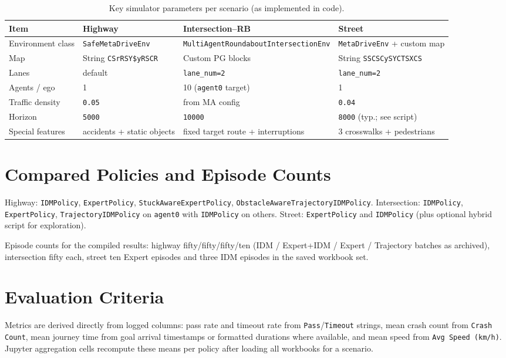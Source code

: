 \documentclass[12pt,a4paper]{report}
\begin{document}
\begin{table}[H]
    \centering
    \caption{Key simulator parameters per scenario (as implemented in code).}
    \label{tab:param_summary}
    \begin{tabularx}{\textwidth}{>{\raggedright\arraybackslash}p{3.1cm} X X X}
        \toprule
        Item & Highway & Intersection--RB & Street \\
        \midrule
        Environment class & \texttt{SafeMetaDriveEnv} & \texttt{MultiAgentRoundaboutIntersectionEnv} & \texttt{MetaDriveEnv} + custom map \\
        Map & String \texttt{CSrRSY\$yRSCR} & Custom PG blocks & String \texttt{SSCSCySYCTSXCS} \\
        Lanes & default & \texttt{lane\_num=2} & \texttt{lane\_num=2} \\
        Agents / ego & 1 & 10 (\texttt{agent0} target) & 1 \\
        Traffic density & \texttt{0.05} & from MA config & \texttt{0.04} \\
        Horizon & \texttt{5000} & \texttt{10000} & \texttt{8000} (typ.; see script) \\
        Special features & accidents + static objects & fixed target route + interruptions & 3 crosswalks + pedestrians \\
        \bottomrule
    \end{tabularx}
\end{table}

\section{Compared Policies and Episode Counts}
Highway: \texttt{IDMPolicy}, \texttt{ExpertPolicy}, \texttt{StuckAwareExpertPolicy}, \texttt{ObstacleAwareTrajectoryIDMPolicy}. Intersection: \texttt{IDMPolicy}, \texttt{ExpertPolicy}, \texttt{TrajectoryIDMPolicy} on \texttt{agent0} with \texttt{IDMPolicy} on others. Street: \texttt{ExpertPolicy} and \texttt{IDMPolicy} (plus optional hybrid script for exploration).

Episode counts for the compiled results: highway fifty/fifty/fifty/ten (IDM / Expert+IDM / Expert / Trajectory batches as archived), intersection fifty each, street ten Expert episodes and three IDM episodes in the saved workbook set.

\section{Evaluation Criteria}
Metrics are derived directly from logged columns: pass rate and timeout rate from \texttt{Pass}/\texttt{Timeout} strings, mean crash count from \texttt{Crash Count}, mean journey time from goal arrival timestamps or formatted durations where available, and mean speed from \texttt{Avg Speed (km/h)}. Jupyter aggregation cells recompute these means per policy after loading all workbooks for a scenario.
\end{document}

